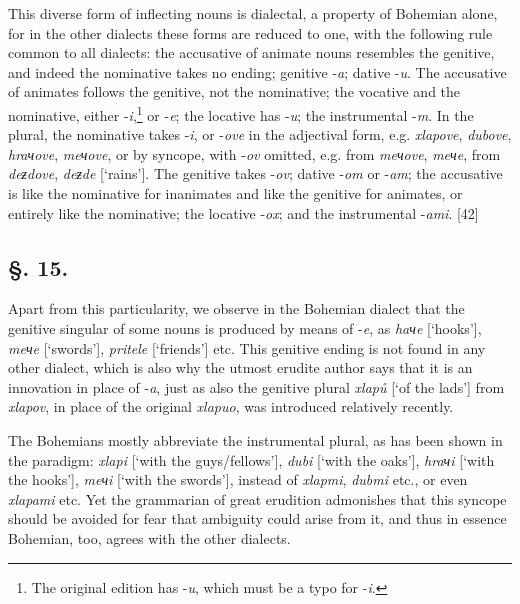 This diverse form of inflecting nouns is dialectal, a property of Bohemian alone, for in the other dialects these forms are reduced to one, with the following rule common to all dialects: the accusative of animate nouns resembles the genitive, and indeed the nominative takes no ending; genitive -\textit{a}; dative -\textit{u}. The accusative of animates follows the genitive, not the nominative; the vocative and the nominative, either -\textit{i},\footnote{The original edition has -\textit{u}, which must be a typo for -\textit{i}.} or -\textit{e}; the locative has -\textit{u}; the instrumental -\textit{m}. In the plural, the nominative takes -\textit{i}, or -\textit{ove} in the adjectival form, e.g. \textit{xlapove}, \textit{dubove}, \textit{hraчove}, \textit{meчove}, or by syncope, with -\textit{ov} omitted, e.g. from \textit{meчove}, \textit{meчe}, from \textit{deƶdove}, \textit{deƶde} [‘rains’]. The genitive takes -\textit{ov}; dative -\textit{om} or -\textit{am}; the accusative is like the nominative for inanimates and like the genitive for animates, or entirely like the nominative; the locative -\textit{ox}; and the instrumental -\textit{ami}. [42]

\subsection*{\hspace*{\fill}§. 15.\hspace*{\fill}}

Apart from this particularity, we observe in the Bohemian dialect that the genitive singular of some nouns is produced by means of -\textit{e}, as \textit{haчe} [‘hooks’], \textit{meчe} [‘swords’], \textit{pritele} [‘friends’] etc. This genitive ending is not found in any other dialect, which is also why the utmost erudite author says that it is an innovation in place of -\textit{a}, just as also the genitive plural \textit{xlapů} [‘of the lads’] from \textit{xlapov}, in place of the original \textit{xlapuo}, was introduced relatively recently.

The Bohemians mostly abbreviate the instrumental plural, as has been shown in the paradigm: \textit{xlapi} [‘with the guys/fellows’], \textit{dubi} [‘with the oaks’], \textit{hraчi} [‘with the hooks’], \textit{meчi} [‘with the swords’], instead of \textit{xlapmi}, \textit{dubmi} etc., or even \textit{xlapami} etc. Yet the grammarian of great erudition admonishes that this syncope should be avoided for fear that ambiguity could arise from it, and thus in essence Bohemian, too, agrees with the other dialects.


